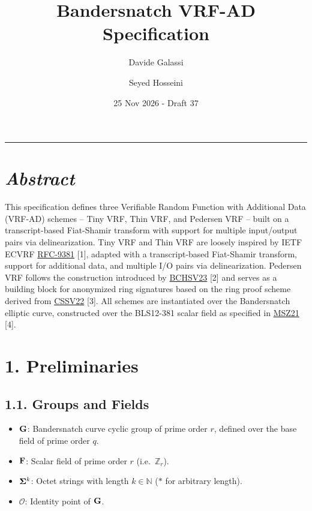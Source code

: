 \documentclass[
]{article}
\title{Bandersnatch VRF-AD Specification}
\author{Davide Galassi \and Seyed Hosseini}
\date{25 Nov 2026 - Draft 37}
\providecommand{\tightlist}{%
  \setlength{\itemsep}{0pt}\setlength{\parskip}{0pt}}
\begin{document}
\maketitle

\newcommand{\G}{\bold{G}}
\newcommand{\F}{\bold{F}}
\newcommand{\S}{\bold{\Sigma}}

\begin{center}\rule{0.5\linewidth}{0.5pt}\end{center}

\section{\texorpdfstring{\emph{Abstract}}{Abstract}}\label{abstract}

This specification defines three Verifiable Random Function with
Additional Data (VRF-AD) schemes -- Tiny VRF, Thin VRF, and Pedersen VRF
-- built on a transcript-based Fiat-Shamir transform with support for
multiple input/output pairs via delinearization. Tiny VRF and Thin VRF
are loosely inspired by IETF ECVRF
\href{https://datatracker.ietf.org/doc/rfc9381}{RFC-9381} {[}1{]},
adapted with a transcript-based Fiat-Shamir transform, support for
additional data, and multiple I/O pairs via delinearization. Pedersen
VRF follows the construction introduced by
\href{https://eprint.iacr.org/2023/002}{BCHSV23} {[}2{]} and serves as a
building block for anonymized ring signatures based on the ring proof
scheme derived from \href{https://eprint.iacr.org/2022/1205}{CSSV22}
{[}3{]}. All schemes are instantiated over the Bandersnatch elliptic
curve, constructed over the BLS12-381 scalar field as specified in
\href{https://eprint.iacr.org/2021/1152}{MSZ21} {[}4{]}.

\section{1. Preliminaries}\label{preliminaries}

\subsection{1.1. Groups and Fields}\label{groups-and-fields}

\begin{itemize}
\tightlist
\item
  \(\bold{G}\): Bandersnatch curve cyclic group of prime order \(r\),
  defined over the base field of prime order \(q\).
\item
  \(\bold{F}\): Scalar field of prime order \(r\)
  (i.e.~\(\mathbb{Z}_r\)).
\item
  \(\bold{\Sigma}^k\): Octet strings with length \(k \in \mathbb{N}\)
  (\(*\) for arbitrary length).
\item
  \(\mathcal{O}\): Identity point of \(\bold{G}\).
\end{itemize}
\end{document}
